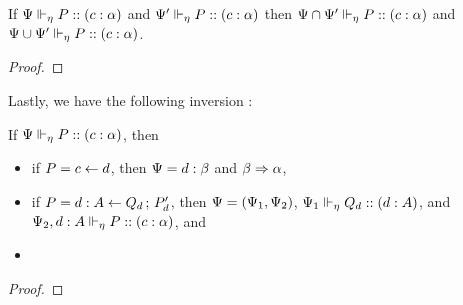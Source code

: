 \begin{lemma}
  If $\typeRecAJ P c \typeList$ and $\typeRecAJR {\ctx'} P c \typeList$ then $\typeRecAJR {\ctx \cap \ctx'} P c \typeList$ and $\typeRecAJR {\ctx \cup \ctx'} P c \typeList$.
\end{lemma}
\begin{proof}
\end{proof}


Lastly, we have the following inversion :
\begin{lemma}
  \label{algorithmic:restricted-process-inversion}
  If $\typeRecAJ P c \typeList$, then
  \begin{itemize}
    \item if $P = \tfwd c d$, then $\ctx = d : \typeListB$ and $\typeListB \subA \typeList$,
    \item if $P = \tspawnType d {Q_d} A {P'_d}$, then $\ctx = \parens{\ctx_1, \ctx_2}$, $\typeRecAJR {\ctx_1} {Q_d} d A$, and $\typeRecAJR {\ctx_2, d : A} P c \typeList$, and
    \item {}
  \end{itemize}
\end{lemma}
\begin{proof}
\end{proof}

